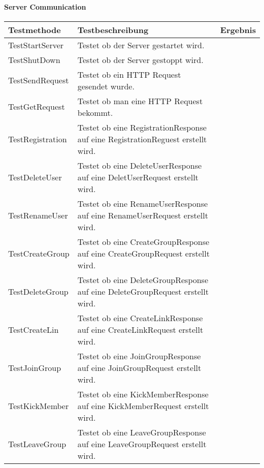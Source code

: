 		\paragraph{Server Communication}
		\begin{table}[H]
			{
				\begin{tabular}{|p{}|p{}|>{\centering}p{}|}
					\hline
					Testmethode & Testbeschreibung & Ergebnis\tabularnewline
					\hline
					\hspace{0pt}TestStartServer & Testet ob der Server gestartet wird. &	\checkmark\tabularnewline
					\hspace{0pt}TestShutDown & Testet ob der Server gestoppt wird. &	\checkmark\tabularnewline
					\hspace{0pt}TestSendRequest & Testet ob ein HTTP Request gesendet wurde. &	\checkmark\tabularnewline
					\hspace{0pt}TestGetRequest & Testet ob man eine HTTP Request bekommt. &	\checkmark\tabularnewline
					\hspace{0pt}TestRegistration & Testet ob eine RegistrationResponse auf eine RegistrationReguest erstellt wird. &	\checkmark\tabularnewline
					\hspace{0pt}TestDeleteUser & Testet ob eine DeleteUserResponse auf eine DeletUserRequest erstellt wird. &	\checkmark\tabularnewline
					\hspace{0pt}TestRenameUser & Testet ob eine RenameUserResponse auf eine RenameUserRequest erstellt wird. &	\checkmark\tabularnewline
					\hspace{0pt}TestCreateGroup & Testet ob eine CreateGroupResponse auf eine CreateGroupRequest erstellt wird. &	\checkmark\tabularnewline
					\hspace{0pt}TestDeleteGroup & Testet ob eine DeleteGroupResponse auf eine DeleteGroupRequest erstellt wird. &	\checkmark\tabularnewline
					\hspace{0pt}TestCreateLin & Testet ob eine CreateLinkResponse auf eine CreateLinkRequest erstellt wird. &	\checkmark\tabularnewline
					\hspace{0pt}TestJoinGroup & Testet ob eine JoinGroupResponse auf eine JoinGroupRequest erstellt wird. &	\checkmark\tabularnewline
					\hspace{0pt}TestKickMember & Testet ob eine KickMemberResponse auf eine KickMemberRequest erstellt wird. &	\checkmark\tabularnewline
					\hspace{0pt}TestLeaveGroup & Testet ob eine LeaveGroupResponse auf eine LeaveGroupRequest erstellt wird. &	\checkmark\tabularnewline

\end{tabular}}
\end{table}
